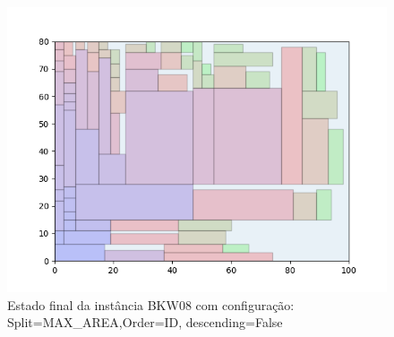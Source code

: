 \begin{figure}[H]
    \centering
    \caption[]{Estado final da instância BKW08 com configuração: Split=MAX_AREA,Order=ID, descending=False}
    \label{fig:bkw08-max_area-id-false}
    \includegraphics[scale=0.5]{output/figures/bkw/bkw08/max_area/id/false/00}
\end{figure}
